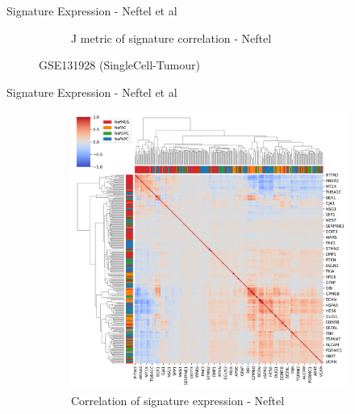 \documentclass[aspectratio=169,9pt]{beamer}
\begin{document}
\begin{frame}{Signature Expression - Neftel et al}
\begin{adjustwidth}{-5cm}{-5cm}
\begin{figure}
\begin{subfigure}[c]{0.4\textwidth}
                    \caption{J metric of signature correlation - Neftel}
                \end{subfigure}
            \caption{GSE131928 (SingleCell-Tumour)}
            \end{figure}
        \end{adjustwidth}
    \end{frame}

    \begin{frame}{Signature Expression - Neftel et al}
        \begin{adjustwidth}{-5cm}{-5cm}
            \centering
            \begin{figure}\ContinuedFloat
                \centering
                \begin{subfigure}[c]{0.48\textwidth}
                    \centering
                    \includegraphics[width=\textwidth]{celllines_Corrplot_Nef}
                    \caption{Correlation of signature expression - Neftel}
                \end{subfigure}
                \begin{subfigure}[c]{0.4\textwidth}
                    \centering

\end{subfigure}
\end{figure}
\end{adjustwidth}
\end{frame}
\end{document}
